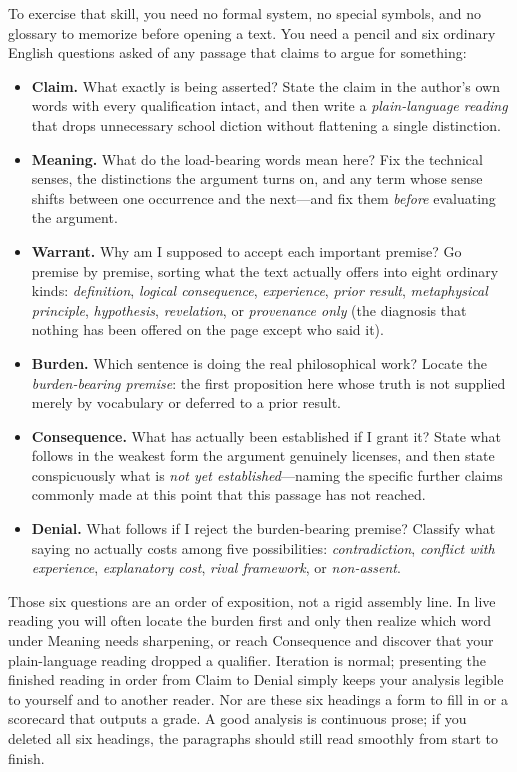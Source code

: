 To exercise that skill, you need no formal system, no special symbols, and no glossary to memorize before opening a text. You need a pencil and six ordinary English questions asked of any passage that claims to argue for something:

\begin{itemize}
\item \textbf{Claim.} What exactly is being asserted? State the claim in the author's own words with every qualification intact, and then write a \emph{plain-language reading} that drops unnecessary school diction without flattening a single distinction.
\item \textbf{Meaning.} What do the load-bearing words mean here? Fix the technical senses, the distinctions the argument turns on, and any term whose sense shifts between one occurrence and the next---and fix them \emph{before} evaluating the argument.
\item \textbf{Warrant.} Why am I supposed to accept each important premise? Go premise by premise, sorting what the text actually offers into eight ordinary kinds: \emph{definition}, \emph{logical consequence}, \emph{experience}, \emph{prior result}, \emph{metaphysical principle}, \emph{hypothesis}, \emph{revelation}, or \emph{provenance only} (the diagnosis that nothing has been offered on the page except who said it).
\item \textbf{Burden.} Which sentence is doing the real philosophical work? Locate the \emph{burden-bearing premise}: the first proposition here whose truth is not supplied merely by vocabulary or deferred to a prior result.
\item \textbf{Consequence.} What has actually been established if I grant it? State what follows in the weakest form the argument genuinely licenses, and then state conspicuously what is \emph{not yet established}---naming the specific further claims commonly made at this point that this passage has not reached.
\item \textbf{Denial.} What follows if I reject the burden-bearing premise? Classify what saying no actually costs among five possibilities: \emph{contradiction}, \emph{conflict with experience}, \emph{explanatory cost}, \emph{rival framework}, or \emph{non-assent}.
\end{itemize}

Those six questions are an order of exposition, not a rigid assembly line. In live reading you will often locate the burden first and only then realize which word under Meaning needs sharpening, or reach Consequence and discover that your plain-language reading dropped a qualifier. Iteration is normal; presenting the finished reading in order from Claim to Denial simply keeps your analysis legible to yourself and to another reader. Nor are these six headings a form to fill in or a scorecard that outputs a grade. A good analysis is continuous prose; if you deleted all six headings, the paragraphs should still read smoothly from start to finish.

